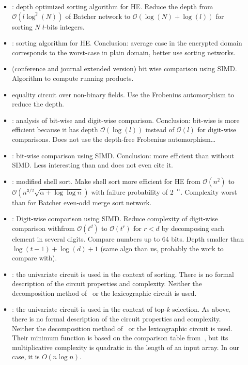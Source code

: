 \begin{itemize}
\item \cite{CDSS15}: depth optimized sorting algorithm for HE. Reduce the depth from $\mathcal{O}(l\log^2(N))$ of Batcher network to $\mathcal{O}(\log(N) + \log(l))$ for sorting $N$ $l$-bits integers.

\item \cite{EGNS15}: sorting algorithm for HE. Conclusion: average case in the encrypted domain corresponds to the worst-case in plain domain, better use sorting networks.

\item \cite{CKK15,CKK16} (conference and journal extended version) bit wise comparison using SIMD. Algorithm to compute running products.

\item \cite{KLLW18} equality circuit over non-binary fields. Use the Frobenius automorphism to reduce the depth. 
  
\item \cite{NGEG17}: analysis of bit-wise and digit-wise comparison. Conclusion: bit-wise is more efficient because it has depth $\mathcal{O}(\log(l))$ instead of $\mathcal{O}(l)$ for digit-wise comparisons. Does not use the depth-free Frobenius automorphism\dots

\item \cite{JS19}: bit-wise comparison using SIMD. Conclusion: more efficient than without SIMD. Less interesting than \cite{CKK15} and does not even cite it.
 
\item \cite{LKN19}: modified shell sort. Make shell sort more efficient for HE from $\mathcal{O}(n^2)$ to $\mathcal{O}(n^{3/2}\sqrt{\alpha+\log\log n})$ with failure probability of $2^{-\alpha}$. Complexity worst than for Batcher even-odd merge sort network.

\item \cite{TLWRK20}: Digit-wise comparison using SIMD. Reduce complexity of digit-wise comparison withfrom $\mathcal{O}(t^{d})$ to $\mathcal{O}(t^{r})$ for $r < d$ by decomposing each element in several digits. Compare numbers up to $64$ bits. Depth smaller than $\log(t-1) + \log(d) + 1$ (same algo than us, probably the work to compare with).

\item \cite{AINA:NGEG17}: the univariate circuit is used in the context of sorting. There is no formal description of the circuit properties and complexity. Neither the decomposition method of~\cite{TLWRK20} or the lexicographic circuit is used.

\item \cite{PoPETS:SFR20}: the univariate circuit is used in the context of top-$k$ selection. As above, there is no formal description of the circuit properties and complexity. Neither the decomposition method of~\cite{TLWRK20} or the lexicographic circuit is used. Their minimum function is based on the comparison table from~\cite{CDSS15}, but its multiplicative complexity is quadratic in the length of an input array. In our case, it is $O(n \log n)$.
\end{itemize}


  
